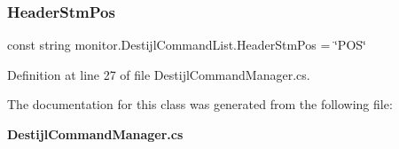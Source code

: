 \mbox{\label{classmonitor_1_1_destijl_command_list_abf99a718161a5a9017d7011cea429ec0}} 
\subsubsection{Header\+Stm\+Pos}
{\footnotesize\ttfamily const string monitor.\+Destijl\+Command\+List.\+Header\+Stm\+Pos = \char`\"{}P\+OS\char`\"{}}



Definition at line 27 of file Destijl\+Command\+Manager.\+cs.



The documentation for this class was generated from the following file\+:\begin{DoxyCompactItemize}
\item 
\textbf{ Destijl\+Command\+Manager.\+cs}\end{DoxyCompactItemize}
